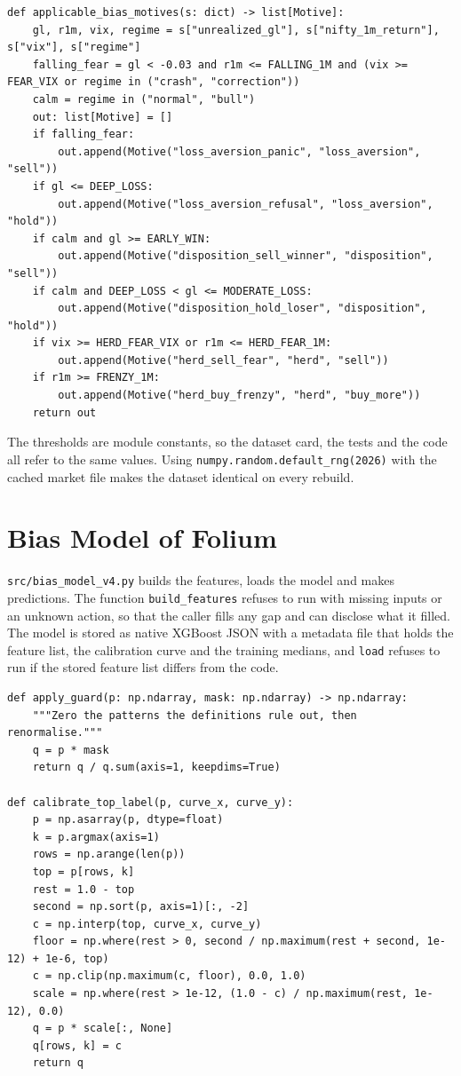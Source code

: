 \begin{lstlisting}[caption={The label rules in code form (\texttt{src/dataset\_v4.py})}, label=lst:rules]
def applicable_bias_motives(s: dict) -> list[Motive]:
    gl, r1m, vix, regime = s["unrealized_gl"], s["nifty_1m_return"], s["vix"], s["regime"]
    falling_fear = gl < -0.03 and r1m <= FALLING_1M and (vix >= FEAR_VIX or regime in ("crash", "correction"))
    calm = regime in ("normal", "bull")
    out: list[Motive] = []
    if falling_fear:
        out.append(Motive("loss_aversion_panic", "loss_aversion", "sell"))
    if gl <= DEEP_LOSS:
        out.append(Motive("loss_aversion_refusal", "loss_aversion", "hold"))
    if calm and gl >= EARLY_WIN:
        out.append(Motive("disposition_sell_winner", "disposition", "sell"))
    if calm and DEEP_LOSS < gl <= MODERATE_LOSS:
        out.append(Motive("disposition_hold_loser", "disposition", "hold"))
    if vix >= HERD_FEAR_VIX or r1m <= HERD_FEAR_1M:
        out.append(Motive("herd_sell_fear", "herd", "sell"))
    if r1m >= FRENZY_1M:
        out.append(Motive("herd_buy_frenzy", "herd", "buy_more"))
    return out
\end{lstlisting}

The thresholds are module constants, so the dataset card, the tests and the code all refer to the same values. Using \texttt{numpy.random.default\_rng(2026)} with the cached market file makes the dataset identical on every rebuild.

\section{Bias Model of Folium}
\texttt{src/bias\_model\_v4.py} builds the features, loads the model and makes predictions. The function \texttt{build\_features} refuses to run with missing inputs or an unknown action, so that the caller fills any gap and can disclose what it filled. The model is stored as native XGBoost JSON with a metadata file that holds the feature list, the calibration curve and the training medians, and \texttt{load} refuses to run if the stored feature list differs from the code.

\begin{lstlisting}[caption={The definitional guard and top-label calibration (\texttt{src/bias\_model\_v4.py})}, label=lst:calib]
def apply_guard(p: np.ndarray, mask: np.ndarray) -> np.ndarray:
    """Zero the patterns the definitions rule out, then renormalise."""
    q = p * mask
    return q / q.sum(axis=1, keepdims=True)

def calibrate_top_label(p, curve_x, curve_y):
    p = np.asarray(p, dtype=float)
    k = p.argmax(axis=1)
    rows = np.arange(len(p))
    top = p[rows, k]
    rest = 1.0 - top
    second = np.sort(p, axis=1)[:, -2]
    c = np.interp(top, curve_x, curve_y)
    floor = np.where(rest > 0, second / np.maximum(rest + second, 1e-12) + 1e-6, top)
    c = np.clip(np.maximum(c, floor), 0.0, 1.0)
    scale = np.where(rest > 1e-12, (1.0 - c) / np.maximum(rest, 1e-12), 0.0)
    q = p * scale[:, None]
    q[rows, k] = c
    return q
\end{lstlisting}


